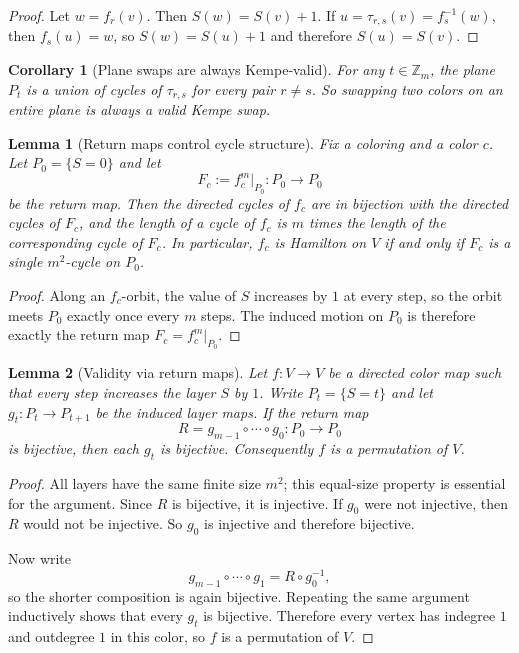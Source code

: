 \documentclass[11pt]{article}
\newtheorem{lemma}{Lemma}
\newtheorem{corollary}{Corollary}
\begin{document}
\begin{proof}
Let $w=f_r(v)$. Then $S(w)=S(v)+1$.
If $u=\tau_{r,s}(v)=f_s^{-1}(w)$, then $f_s(u)=w$, so $S(w)=S(u)+1$ and therefore $S(u)=S(v)$.
\end{proof}

\begin{corollary}[Plane swaps are always Kempe-valid]\label{cor:plane-swaps}
For any $t\in\mathbb Z_m$, the plane $P_t$ is a union of cycles of $\tau_{r,s}$ for every pair $r\ne s$.
So swapping two colors on an entire plane is always a valid Kempe swap.
\end{corollary}

\begin{lemma}[Return maps control cycle structure]\label{lem:return}
Fix a coloring and a color $c$.
Let $P_0=\{S=0\}$ and let
\[
F_c:=f_c^m\big|_{P_0}:P_0\to P_0
\]
be the return map.
Then the directed cycles of $f_c$ are in bijection with the directed cycles of $F_c$, and the length of a cycle of $f_c$ is $m$ times the length of the corresponding cycle of $F_c$.
In particular, $f_c$ is Hamilton on $V$ if and only if $F_c$ is a single $m^2$-cycle on $P_0$.
\end{lemma}

\begin{proof}
Along an $f_c$-orbit, the value of $S$ increases by $1$ at every step, so the orbit meets $P_0$ exactly once every $m$ steps.
The induced motion on $P_0$ is therefore exactly the return map $F_c=f_c^m|_{P_0}$.
\end{proof}


\begin{lemma}[Validity via return maps]\label{lem:return-validity}
Let $f:V\to V$ be a directed color map such that every step increases the layer $S$ by $1$.
Write $P_t=\{S=t\}$ and let $g_t:P_t\to P_{t+1}$ be the induced layer maps.
If the return map
\[
R=g_{m-1}\circ\cdots\circ g_0:P_0\to P_0
\]
is bijective, then each $g_t$ is bijective.
Consequently $f$ is a permutation of $V$.
\end{lemma}

\begin{proof}
All layers have the same finite size $m^2$; this equal-size property is essential for the argument.
Since $R$ is bijective, it is injective.
If $g_0$ were not injective, then $R$ would not be injective.
So $g_0$ is injective and therefore bijective.

Now write
\[
g_{m-1}\circ\cdots\circ g_1 = R\circ g_0^{-1},
\]
so the shorter composition is again bijective.
Repeating the same argument inductively shows that every $g_t$ is bijective.
Therefore every vertex has indegree $1$ and outdegree $1$ in this color, so $f$ is a permutation of $V$.
\end{proof}
\end{document}
